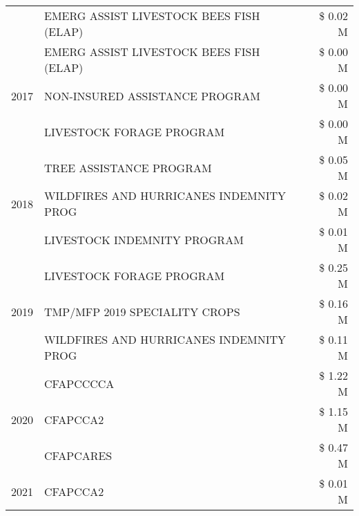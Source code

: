 \begin{tabular}{llr}
 & EMERG ASSIST LIVESTOCK BEES FISH (ELAP) & \$ 0.02 M \\
\cline{1-3}
\multirow[t]{3}{*}{2017} & EMERG ASSIST LIVESTOCK BEES FISH (ELAP) & \$ 0.00 M \\
 & NON-INSURED ASSISTANCE PROGRAM & \$ 0.00 M \\
 & LIVESTOCK FORAGE PROGRAM & \$ 0.00 M \\
\cline{1-3}
\multirow[t]{3}{*}{2018} & TREE ASSISTANCE PROGRAM & \$ 0.05 M \\
 & WILDFIRES AND HURRICANES INDEMNITY PROG & \$ 0.02 M \\
 & LIVESTOCK INDEMNITY PROGRAM & \$ 0.01 M \\
\cline{1-3}
\multirow[t]{3}{*}{2019} & LIVESTOCK FORAGE PROGRAM & \$ 0.25 M \\
 & TMP/MFP 2019 SPECIALITY CROPS & \$ 0.16 M \\
 & WILDFIRES AND HURRICANES INDEMNITY PROG & \$ 0.11 M \\
\cline{1-3}
\multirow[t]{3}{*}{2020} & CFAPCCCCA & \$ 1.22 M \\
 & CFAPCCA2 & \$ 1.15 M \\
 & CFAPCARES & \$ 0.47 M \\
\cline{1-3}
2021 & CFAPCCA2 & \$ 0.01 M \\
\cline{1-3}
\bottomrule
\end{tabular}
